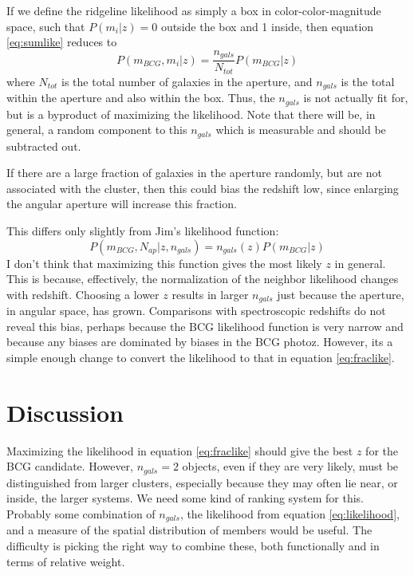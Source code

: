 \documentclass[preprint]{aastex}
\begin{document}
If we define the ridgeline likelihood as simply a box in color-color-magnitude
space, such that $P(m_i | z) = 0$ outside the box and 1 inside, then equation
\ref{eq:sumlike} reduces to
\begin{equation} \label{eq:fraclike}
P(m_{BCG}, m_i | z) = \frac{n_{gals}}{N_{tot}}P(m_{BCG}|z)
\end{equation}
where $N_{tot}$ is the total number of galaxies in the aperture, and $n_{gals}$
is the total within the aperture and also within the box.  Thus, the $n_{gals}$
is not actually fit for, but is a byproduct of maximizing the likelihood. Note
that there will be, in general, a random component to this $n_{gals}$ which is
measurable and should be subtracted out.

If there are a large fraction of galaxies in the aperture randomly, but are not
associated with the cluster, then this could bias the redshift low, since
enlarging the angular aperture will increase this fraction.

This differs only slightly from Jim's likelihood function:
\begin{equation}
P(m_{BCG}, N_{ap} | z, n_{gals}) = n_{gals}(z)P(m_{BCG}|z)
\end{equation}
I don't think that maximizing this function gives the most likely $z$ in
general. This is because, effectively, the normalization of the neighbor
likelihood changes with redshift.  Choosing a lower $z$ results in larger
$n_{gals}$ just because the aperture, in angular space, has grown.  Comparisons
with spectroscopic redshifts do not reveal this bias, perhaps because the BCG
likelihood function is very narrow and because any biases are dominated by
biases in the BCG photoz.  However, its a simple enough change to convert the
likelihood to that in equation \ref{eq:fraclike}.

\section{Discussion}

Maximizing the likelihood in equation \ref{eq:fraclike} should give the best
$z$ for the BCG candidate.  However, $n_{gals} = 2$ objects, even if they are
very likely, must be distinguished from larger clusters, especially because
they may often lie near, or inside, the larger systems.  We need some kind of
ranking system for this.  Probably some combination of $n_{gals}$, the
likelihood from equation \ref{eq:likelihood}, and a measure of the spatial
distribution of members would be useful.  The difficulty is picking the right
way to combine these, both functionally and in terms of relative weight.  
\end{document}
